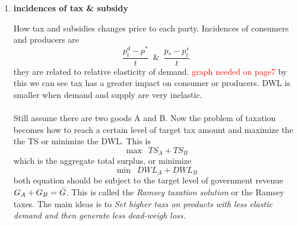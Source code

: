 \documentclass[10pt]{article}
\newenvironment{changemargin}[2]{%
  \begin{list}{}{%
    \setlength{\topsep}{0pt}%
    \setlength{\leftmargin}{#1}%
    \setlength{\rightmargin}{#2}%
    \setlength{\listparindent}{\parindent}%
    \setlength{\itemindent}{\parindent}%
    \setlength{\parsep}{\parskip}%
  }%
  \item[]}{\end{list}}
\begin{document}
\begin{changemargin}{-0.125in}{0in}
\begin{enumerate}
     \bigskip
     
     \item \textbf{incidences of tax \& subsidy}
     
     \medskip
     
     How tax and subsidies changes price to each party. Incidences of consumers and producers are 
     \[
     \frac{p_t^d - p^*}{t} \,\,\,\&\,\,\, \frac{p_*-p_t^s}{t}
     \]
     they are related to relative elasticity of demand. \textcolor{red}{graph needed on page7} by this we can see tax has a greater impact on consumer or producers. DWL is smaller when demand and supply are very inelastic.
     \\
     \\
     Still assume there are two goods A and B. Now the problem of taxation becomes how to reach a certain level of target tax amount and maximize the the TS or minimize the DWL. This is 
     \[
     \max \,\,\,TS_A + TS_B 
     \]
     which is the aggregate total surplus, or minimize
     \[
     \min\,\,\, DWL_A + DWL_B
     \]
     both equation should be subject to the target level of government revenue $G_A + G_B = \Bar{G}$. This is called the 
     \textit{Ramsey taxation solution} or the Ramsey taxes. The main ideas is to \textit{Set higher taxs on products with less elastic demand and then generate less dead-weigh loss.}
                  
                  \end{enumerate}
                  
                  
                  
                 
\end{changemargin}
\end{document}
